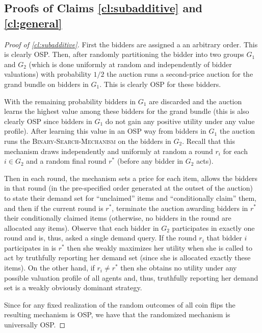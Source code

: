 \subsection{Proofs of Claims \ref{cl:subadditive} and \ref{cl:general}} \label{subsec::proofs-subadd-general}
\begin{proof}[Proof of \cref{cl:subadditive}]
First the bidders are assigned a an arbitrary order. 
This is clearly OSP.  Then, after randomly partitioning the bidder into two groups $G_1$ and $G_2$ (which is done uniformly at random and independently of bidder valuations) with probability $1/2$ the auction runs a second-price auction for the grand bundle on bidders in $G_1$.  This is clearly OSP for these bidders.  

With the remaining probability bidders in $G_1$ are discarded and the auction learns the highest value among these bidders for the grand bundle (this is also clearly OSP since bidders in $G_1$ do not gain any positive utility under any value profile).  After learning this value in an OSP way from bidders in $G_1$ the auction runs the \textsc{Binary-Search-Mechanism} on the bidders in $G_2$.  Recall that this mechanism draws independently and uniformly at random a round $r_i$ for each $i \in G_2$ and a random final round $r^*$ (before any bidder in $G_2$ acts).  

Then in each round, the mechanism sets a price for each item, allows the bidders in that round (in the pre-specified order generated at the outset of the auction) to state their demand set for ``unclaimed'' items and ``conditionally claim'' them, and then if the current round is $r^*$, terminate the auction awarding bidders in $r^*$ their conditionally claimed items (otherwise, no bidders in the round are allocated any items).  Observe that each bidder in $G_2$ participates in exactly one round and is, thus, asked a single demand query.  If the round $r_i$ that bidder $i$ participates in is $r^*$ then she weakly maximizes her utility when she is called to act by truthfully reporting her demand set (since she is allocated exactly these items).  On the other hand, if $r_i \neq r^*$ then she obtains no utility under any possible valuation profile of all agents and, thus, truthfully reporting her demand set is a weakly obviously dominant strategy.  

Since for any fixed realization of the random outcomes of all coin flips the resulting mechanism is OSP, we have that the randomized mechanism is universally OSP.
\end{proof}
